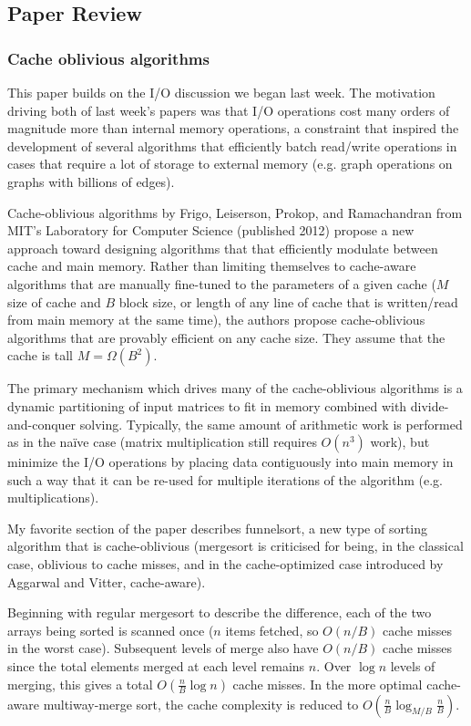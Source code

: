 \subsection{Paper Review}
\subsubsection{Cache oblivious algorithms}

This paper builds on the I/O discussion we began last week. The motivation driving both of last week's papers was that I/O operations cost many orders of magnitude more than internal memory operations, a constraint that inspired the development of several algorithms that efficiently batch read/write operations in cases that require a lot of storage to external memory (e.g. graph operations on graphs with billions of edges).

Cache-oblivious algorithms by Frigo, Leiserson, Prokop, and Ramachandran from MIT's Laboratory for Computer Science (published 2012) propose a new approach toward designing algorithms that that efficiently modulate between cache and main memory. Rather than limiting themselves to cache-aware algorithms that are manually fine-tuned to the parameters of a given cache ($M$ size of cache and $B$ block size, or length of any line of cache that is written/read from main memory at the same time), the authors propose cache-oblivious algorithms that are provably efficient on any cache size. They assume that the cache is tall $M = \Omega(B^2)$.

The primary mechanism which drives many of the cache-oblivious algorithms is a dynamic partitioning of input matrices to fit in memory combined with divide-and-conquer solving. Typically, the same amount of arithmetic work is performed as in the naïve case (matrix multiplication still requires $O(n^3)$ work), but minimize the I/O operations by placing data contiguously into main memory in such a way that it can be re-used for multiple iterations of the algorithm (e.g. multiplications). 

My favorite section of the paper describes funnelsort, a new type of sorting algorithm that is cache-oblivious (mergesort is criticised for being, in the classical case, oblivious to cache misses, and in the cache-optimized case introduced by Aggarwal and Vitter, cache-aware). 

Beginning with regular mergesort to describe the difference, each of the two arrays being sorted is scanned once ($n$ items fetched, so $O(n/B)$ cache misses in the worst case). Subsequent levels of merge also have $O(n/B)$ cache misses since the total elements merged at each level remains $n$. Over $\log{n}$ levels of merging, this gives a total $O(\frac{n}{B}\log{n})$ cache misses. In the more optimal cache-aware multiway-merge sort, the cache complexity is reduced to $O(\frac{n}{B}\log_{M/B}\frac{n}{B})$.

